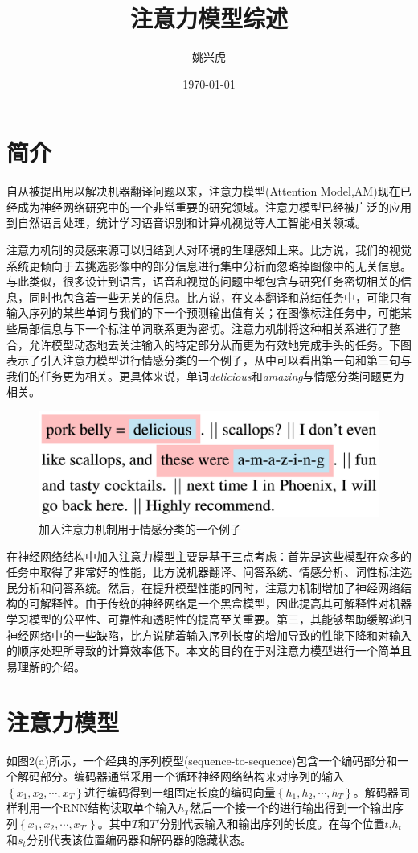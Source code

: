 \documentclass{ctexart}
\title{注意力模型综述}
\author{姚兴虎}
\date{\today}
\begin{document}
\maketitle
\section{简介}
自从被提出用以解决机器翻译问题以来，注意力模型(Attention Model,AM)现在已经成为神经网络研究中的一个非常重要的研究领域。注意力模型已经被广泛的应用到自然语言处理，统计学习语音识别和计算机视觉等人工智能相关领域。

注意力机制的灵感来源可以归结到人对环境的生理感知上来。比方说，我们的视觉系统更倾向于去挑选影像中的部分信息进行集中分析而忽略掉图像中的无关信息。与此类似，很多设计到语言，语音和视觉的问题中都包含与研究任务密切相关的信息，同时也包含着一些无关的信息。比方说，在文本翻译和总结任务中，可能只有输入序列的某些单词与我们的下一个预测输出值有关；在图像标注任务中，可能某些局部信息与下一个标注单词联系更为密切。注意力机制将这种相关系进行了整合，允许模型动态地去关注输入的特定部分从而更为有效地完成手头的任务。下图表示了引入注意力模型进行情感分类的一个例子，从中可以看出第一句和第三句与我们的任务更为相关。更具体来说，单词\textit{delicious}和\textit{amazing}与情感分类问题更为相关。
\begin{figure}[htb!]
	\centering
	\includegraphics[scale=0.38]{document.png}
	\caption{加入注意力机制用于情感分类的一个例子}
\end{figure}
在神经网络结构中加入注意力模型主要是基于三点考虑：首先是这些模型在众多的任务中取得了非常好的性能，比方说机器翻译、问答系统、情感分析、词性标注选民分析和问答系统。然后，在提升模型性能的同时，注意力机制增加了神经网络结构的可解释性。由于传统的神经网络是一个黑盒模型，因此提高其可解释性对机器学习模型的公平性、可靠性和透明性的提高至关重要。第三，其能够帮助缓解递归神经网络中的一些缺陷，比方说随着输入序列长度的增加导致的性能下降和对输入的顺序处理所导致的计算效率低下。本文的目的在于对注意力模型进行一个简单且易理解的介绍。
\section{注意力模型}
如图2(a)所示，一个经典的序列模型(sequence-to-sequence)包含一个编码部分和一个解码部分。编码器通常采用一个循环神经网络结构来对序列的输入$\left\{x_1,x_2,\cdots,x_T\right\}$进行编码得到一组固定长度的编码向量$\left\{h_1,h_2,\cdots,h_T\right\}$。解码器同样利用一个RNN结构读取单个输入$h_T$然后一个接一个的进行输出得到一个输出序列$\left\{x_1,x_2,\cdots,x_{T'}\right\}$。其中$T$和$T'$分别代表输入和输出序列的长度。在每个位置$t$,$h_t$和$s_t$分别代表该位置编码器和解码器的隐藏状态。
\end{document}
